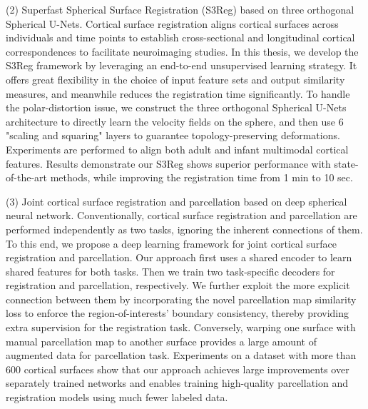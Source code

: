 (2) Superfast Spherical Surface Registration (S3Reg) based on three orthogonal Spherical U-Nets. Cortical surface registration aligns cortical surfaces across individuals and time points to establish cross-sectional and longitudinal cortical correspondences to facilitate neuroimaging studies. In this thesis, we develop the S3Reg framework by leveraging an end-to-end unsupervised learning strategy. It offers great flexibility in the choice of input feature sets and output similarity measures, and meanwhile reduces the registration time significantly. To handle the polar-distortion issue, we construct the three orthogonal Spherical U-Nets architecture to directly learn the velocity fields on the sphere, and then use 6 "scaling and squaring" layers to guarantee topology-preserving deformations. Experiments are performed to align both adult and infant multimodal cortical features. Results demonstrate our S3Reg shows superior performance with state-of-the-art methods, while improving the registration time from 1 min to 10 sec.	

(3) Joint cortical surface registration and parcellation based on deep spherical neural network. Conventionally, cortical surface registration and parcellation are performed independently as two tasks, ignoring the inherent connections of them. To this end, we propose a deep learning framework for joint cortical surface registration and parcellation. Our approach first uses a shared encoder to learn shared features for both tasks. Then we train two task-specific decoders for registration and parcellation, respectively. We further exploit the more explicit connection between them by incorporating the novel parcellation map similarity loss to enforce the region-of-interests' boundary consistency, thereby providing extra supervision for the registration task. Conversely, warping one surface with manual parcellation map to another surface provides a large amount of augmented data for parcellation task. Experiments on a dataset with more than 600 cortical surfaces show that our approach achieves large improvements over separately trained networks and enables training high-quality parcellation and registration models using much fewer labeled data.
 
